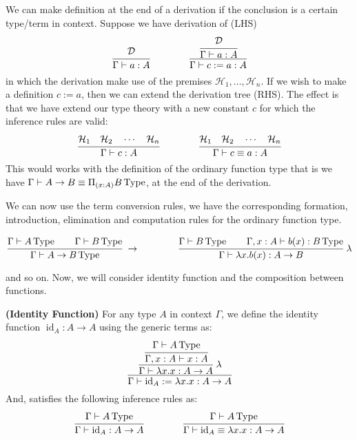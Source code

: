 \begin{remark}
    We can make definition at the end of a derivation if the conclusion is a certain type/term in context. Suppose we have derivation of (LHS)
    \begin{equation*}
        \cfrac{\mathcal{D}}{\Gamma\vdash a:A} \qquad \qquad \cfrac{\cfrac{\mathcal{D}}{\Gamma\vdash a:A}}{\Gamma\vdash c:= a:A}
    \end{equation*}
    in which the derivation make use of the premises $\mathcal{H}_1,\dots,\mathcal{H}_n$. If we wish to make a definition $c:=a$, then we can extend the derivation tree (RHS). The effect is that we have extend our type theory with a new constant $c$ for which the inference rules are valid:
    \begin{equation*}
        \cfrac{\mathcal{H}_1\quad\mathcal{H}_2\quad\cdots\quad\mathcal{H}_n}{\Gamma\vdash c:A} \qquad \qquad
        \cfrac{\mathcal{H}_1\quad\mathcal{H}_2\quad\cdots\quad\mathcal{H}_n}{\Gamma\vdash c\equiv a:A} 
    \end{equation*}
    This would works with the definition of the ordinary function type that is we have $\Gamma\vdash A\rightarrow B\equiv\Pi_{(x:A)}B\operatorname{Type} $, at the end of the derivation.
\end{remark}

We can now use the  term conversion rules, we have the corresponding formation, introduction, elimination and computation rules for the ordinary function type.

\begin{equation*}
    \cfrac{\Gamma\vdash A\operatorname{Type}\qquad \Gamma\vdash B\operatorname{Type}}{\Gamma\vdash A\to B\operatorname{Type}} \ \to \qquad\qquad \cfrac{\Gamma\vdash B\operatorname{Type}\qquad \Gamma, x:A\vdash b(x):B\operatorname{Type}}{\Gamma\vdash\lambda x.b(x) :A\to B}\ \lambda
\end{equation*}

and so on. Now, we will consider identity function and the composition between functions. 

\begin{definition}{\textbf{(Identity Function)}}
    For any type $A$ in context $\Gamma$, we define the identity function $\operatorname{id}_A:A\rightarrow A$ using the generic terms as: 
    \begin{equation*}
        \cfrac{\cfrac{\cfrac{\Gamma\vdash A\type}{\Gamma, x:A\vdash x:A}}{\Gamma\vdash \lambda x.x:A\rightarrow A}\ \lambda}{\Gamma\vdash\operatorname{id}_A:= \lambda x.x:A\rightarrow A}
    \end{equation*}
    And, satisfies the following inference rules as:
    \begin{equation*}
        \cfrac{\Gamma\vdash A \operatorname{Type} }{\Gamma\vdash\operatorname{id}_A:A\rightarrow A} \qquad \qquad \cfrac{\Gamma\vdash A\operatorname{Type} }{\Gamma\vdash\operatorname{id}_A\equiv\lambda x.x:A\rightarrow A}
    \end{equation*}
\end{definition}

